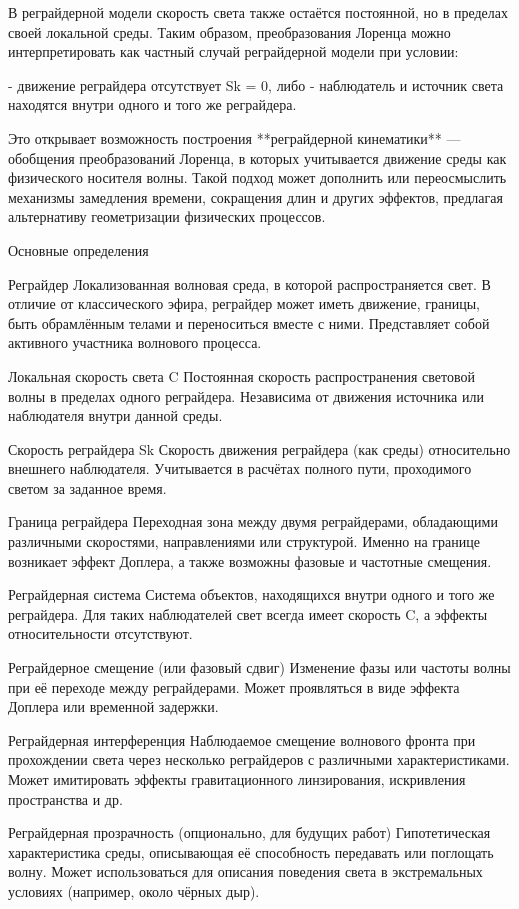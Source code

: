 \documentclass[12pt]{article}
\begin{document}
В реграйдерной модели скорость света также остаётся постоянной, но в пределах своей локальной среды. Таким образом, преобразования Лоренца можно интерпретировать как частный случай реграйдерной модели при условии:

- движение реграйдера отсутствует Sk = 0, либо
- наблюдатель и источник света находятся внутри одного и того же реграйдера.

Это открывает возможность построения **реграйдерной кинематики** — обобщения преобразований Лоренца, в которых учитывается движение среды как физического носителя волны. Такой подход может дополнить или переосмыслить механизмы замедления времени, сокращения длин и других эффектов, предлагая альтернативу геометризации физических процессов.


Основные определения

Реграйдер
Локализованная волновая среда, в которой распространяется свет. В отличие от классического эфира, реграйдер может иметь движение, границы, быть обрамлённым телами и переноситься вместе с ними. Представляет собой активного участника волнового процесса.

Локальная скорость света C
Постоянная скорость распространения световой волны в пределах одного реграйдера. Независима от движения источника или наблюдателя внутри данной среды.

Скорость реграйдера Sk
Скорость движения реграйдера (как среды) относительно внешнего наблюдателя. Учитывается в расчётах полного пути, проходимого светом за заданное время.

Граница реграйдера
Переходная зона между двумя реграйдерами, обладающими различными скоростями, направлениями или структурой. Именно на границе возникает эффект Доплера, а также возможны фазовые и частотные смещения.

Реграйдерная система
Система объектов, находящихся внутри одного и того же реграйдера. Для таких наблюдателей свет всегда имеет скорость C, а эффекты относительности отсутствуют.

Реграйдерное смещение (или фазовый сдвиг)
Изменение фазы или частоты волны при её переходе между реграйдерами. Может проявляться в виде эффекта Доплера или временной задержки.

Реграйдерная интерференция
Наблюдаемое смещение волнового фронта при прохождении света через несколько реграйдеров с различными характеристиками. Может имитировать эффекты гравитационного линзирования, искривления пространства и др.

Реграйдерная прозрачность (опционально, для будущих работ)
Гипотетическая характеристика среды, описывающая её способность передавать или поглощать волну. Может использоваться для описания поведения света в экстремальных условиях (например, около чёрных дыр).
\end{document}
